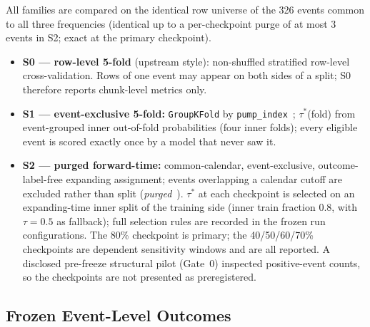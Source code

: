 \documentclass[runningheads]{llncs}
\begin{document}
All families are compared on the identical row universe of the 326
events common to all three frequencies (identical up to a
per-checkpoint purge of at most 3 events in S2; exact at the primary
checkpoint).

\begin{itemize}
\item \textbf{S0 --- row-level 5-fold} (upstream style): non-shuffled
stratified row-level cross-validation. Rows of one event may appear on
both sides of a split; S0 therefore reports chunk-level metrics only.
\item \textbf{S1 --- event-exclusive 5-fold:} \texttt{GroupKFold} by
\texttt{pump\_index}~\cite{Roberts2017}; $\tau^{*}$(fold) from
event-grouped inner out-of-fold probabilities (four inner folds); every
eligible event is scored exactly once by a model that never saw it.
\item \textbf{S2 --- purged forward-time:} common-calendar,
event-exclusive, outcome-label-free expanding assignment; events
overlapping a calendar cutoff are excluded rather than split
(\emph{purged}~\cite{LopezDePrado2018,Bergmeir2012}). $\tau^{*}$ at
each checkpoint is selected on an expanding-time inner split of the
training side (inner train fraction 0.8, with $\tau = 0.5$ as
fallback); full selection rules are recorded in the frozen run
configurations. The 80\% checkpoint is primary; the 40/50/60/70\%
checkpoints are dependent sensitivity windows and are all reported. A
disclosed pre-freeze structural pilot (Gate~0) inspected positive-event
counts, so the checkpoints are not presented as preregistered.
\end{itemize}

\subsection{Frozen Event-Level Outcomes}\label{sec:outcomes}
\end{document}
